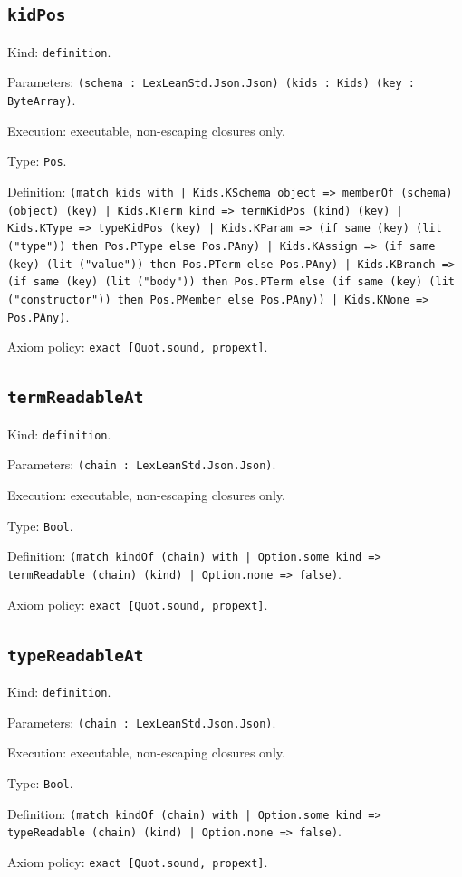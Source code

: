 \documentclass[11pt]{article}
\begin{document}
\subsection*{\texttt{kidPos}}
\noindent Kind: \texttt{definition}.\par
\noindent Parameters: \texttt{(schema : LexLeanStd.Json.Json) (kids : Kids) (key : ByteArray)}.\par
\noindent Execution: executable, non-escaping closures only.\par
\noindent Type: \texttt{Pos}.\par
\noindent Definition: \texttt{(match kids with | Kids.KSchema object => memberOf (schema) (object) (key) | Kids.KTerm kind => termKidPos (kind) (key) | Kids.KType => typeKidPos (key) | Kids.KParam => (if same (key) (lit ("type")) then Pos.PType else Pos.PAny) | Kids.KAssign => (if same (key) (lit ("value")) then Pos.PTerm else Pos.PAny) | Kids.KBranch => (if same (key) (lit ("body")) then Pos.PTerm else (if same (key) (lit ("constructor")) then Pos.PMember else Pos.PAny)) | Kids.KNone => Pos.PAny)}.\par
\noindent Axiom policy: \texttt{exact [Quot.sound, propext]}.\par
\subsection*{\texttt{termReadableAt}}
\noindent Kind: \texttt{definition}.\par
\noindent Parameters: \texttt{(chain : LexLeanStd.Json.Json)}.\par
\noindent Execution: executable, non-escaping closures only.\par
\noindent Type: \texttt{Bool}.\par
\noindent Definition: \texttt{(match kindOf (chain) with | Option.some kind => termReadable (chain) (kind) | Option.none => false)}.\par
\noindent Axiom policy: \texttt{exact [Quot.sound, propext]}.\par
\subsection*{\texttt{typeReadableAt}}
\noindent Kind: \texttt{definition}.\par
\noindent Parameters: \texttt{(chain : LexLeanStd.Json.Json)}.\par
\noindent Execution: executable, non-escaping closures only.\par
\noindent Type: \texttt{Bool}.\par
\noindent Definition: \texttt{(match kindOf (chain) with | Option.some kind => typeReadable (chain) (kind) | Option.none => false)}.\par
\noindent Axiom policy: \texttt{exact [Quot.sound, propext]}.\par
\end{document}

